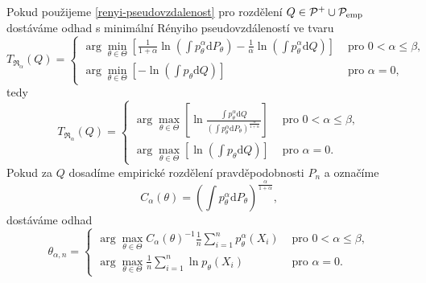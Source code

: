 \noindent Pokud použijeme \eqref{renyi-pseudovzdalenost} pro rozdělení $Q \in \mathcal{P}^+ \cup \mathcal{P}_\mathrm{emp}$ dostáváme odhad s minimální Rényiho pseudovzdáleností ve tvaru
\begin{equation}
	T_{\mathfrak{R}_\alpha}(Q) = 
	\begin{cases}
		 \displaystyle{ \arg \min_{\theta \in \Theta} \left[\frac{1}{1+\alpha} \ln(\int p_\theta^\alpha\mathrm{d}P_\theta) - \frac{1}{\alpha} \ln(\int p_\theta^\alpha\mathrm{d}Q) \right]} & \text{ pro } 0 < \alpha \leq \beta, \\
		 \displaystyle{ \arg \min_{\theta \in \Theta} \left[- \ln(\int p_\theta\mathrm{d}Q) \right] }& \text{ pro } \alpha = 0,
	\end{cases}	
\end{equation}
tedy
\begin{equation}
	T_{\mathfrak{R}_\alpha}(Q) = 
	\begin{cases}
		 \displaystyle{ \arg \max_{\theta \in \Theta} \left[\ln\frac{\int p_\theta^\alpha\mathrm{d}Q}{(\int p_\theta^\alpha\mathrm{d}P_\theta)^{\frac{\alpha}{1+\alpha}}} \right] }& \text{ pro } 0 < \alpha \leq \beta, \\
		 \displaystyle{ \arg \max_{\theta \in \Theta} \left[\ln(\int p_\theta\mathrm{d}Q) \right] }& \text{ pro } \alpha = 0.
	\end{cases}	
\end{equation}
Pokud za $Q$ dosadíme empirické rozdělení pravděpodobnosti $P_n$ a označíme 
\begin{equation}
	C_\alpha (\theta) = \left(\int p_\theta^\alpha\mathrm{d}P_\theta \right)^{\frac{\alpha}{1+\alpha}},
\end{equation}
dostáváme odhad 
\begin{equation}
	\theta_{\alpha,n} = 
	\begin{cases}
		\displaystyle{ \arg \max_{\theta \in \Theta} C_\alpha\left( \theta \right)^{-1} \frac{1}{n} \sum_{i=1}^n p_{\theta}^{\alpha}\left( X_i \right) } & \text{ pro } 0 < \alpha \leq \beta, \\
		\displaystyle{ \arg \max_{\theta \in \Theta}  \frac{1}{n} \sum_{i=1}^n \ln p_{\theta}\left( X_i \right) } & \text{ pro } \alpha = 0.
	\end{cases}	
	\label{Renyi-estimator_formula}
\end{equation}

